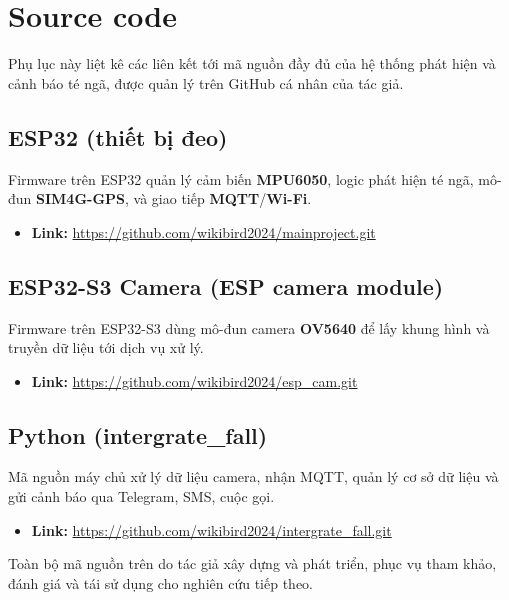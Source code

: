 
\chapter{Source code}      
\label{appendix:code}

Phụ lục này liệt kê các liên kết tới mã nguồn đầy đủ của hệ thống phát hiện và cảnh báo té ngã, được quản lý trên GitHub cá nhân của tác giả.

\section{ESP32 (thiết bị đeo)}
Firmware trên ESP32 quản lý cảm biến \textbf{MPU6050}, logic phát hiện té ngã, mô-đun \textbf{SIM4G-GPS}, và giao tiếp \textbf{MQTT}/\textbf{Wi-Fi}.
\begin{itemize}
    \item \textbf{Link:} \url{https://github.com/wikibird2024/mainproject.git}
\end{itemize}

\section{ESP32-S3 Camera (ESP camera module)}
Firmware trên ESP32-S3 dùng mô-đun camera \textbf{OV5640} để lấy khung hình và truyền dữ liệu tới dịch vụ xử lý.
\begin{itemize}
    \item \textbf{Link:} \url{https://github.com/wikibird2024/esp_cam.git}
\end{itemize}

\section{Python (intergrate\_fall)}
Mã nguồn máy chủ xử lý dữ liệu camera, nhận MQTT, quản lý cơ sở dữ liệu và gửi cảnh báo qua Telegram, SMS, cuộc gọi.
\begin{itemize}
    \item \textbf{Link:} \url{https://github.com/wikibird2024/intergrate_fall.git}
\end{itemize}

\vspace{1cm}
Toàn bộ mã nguồn trên do tác giả \TENTACGIA{} xây dựng và phát triển, phục vụ tham khảo, đánh giá và tái sử dụng cho nghiên cứu tiếp theo.
